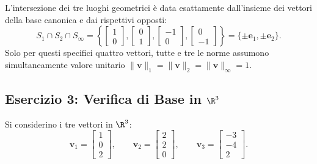 \begin{property}
L'intersezione dei tre luoghi geometrici è data esattamente dall'insieme dei vettori della base canonica e dai rispettivi opposti:
\begin{equation}
    S_1 \cap S_2 \cap S_\infty = \left\{ \begin{bmatrix} 1 \\ 0 \end{bmatrix}, \begin{bmatrix} 0 \\ 1 \end{bmatrix}, \begin{bmatrix} -1 \\ 0 \end{bmatrix}, \begin{bmatrix} 0 \\ -1 \end{bmatrix} \right\} = \{\pm \mathbf{e}_1, \pm \mathbf{e}_2\}.
\end{equation}
Solo per questi specifici quattro vettori, tutte e tre le norme assumono simultaneamente valore unitario $\|\mathbf{v}\|_1 = \|\mathbf{v}\|_2 = \|\mathbf{v}\|_\infty = 1$.
\end{property}

\subsection{Esercizio 3: Verifica di Base in \texorpdfstring{$\R^3$}{R3}}

Si considerino i tre vettori in $\R^3$:
\begin{equation}
    \mathbf{v}_1 = \begin{bmatrix} 1 \\ 0 \\ 2 \end{bmatrix}, \qquad \mathbf{v}_2 = \begin{bmatrix} 2 \\ 2 \\ 0 \end{bmatrix}, \qquad \mathbf{v}_3 = \begin{bmatrix} -3 \\ -4 \\ 2 \end{bmatrix}.
\end{equation}

